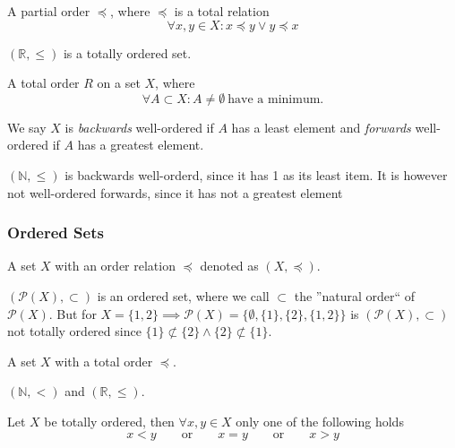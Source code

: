 \begin{definition}
   A partial order \(\preceq\), where \(\preceq\) is a total relation
   \[\forall x, y \in X: x \preceq y \lor y \preceq x\]
\end{definition}
\begin{example}
   \((\mathbb{R}, \leq)\) is a totally ordered set.
\end{example}

\begin{definition}
   A total order \(R\) on a set \(X\), where
   \[\forall A \subset X: A \neq \emptyset~\text{have a minimum.}\]
\end{definition}
\begin{remark}
   We say \(X\) is \emph{backwards} well-ordered if \(A\) has a least element and \emph{forwards} well-ordered if \(A\) has a greatest element.
\end{remark}
\begin{example}
   \((\mathbb{N}, \leq)\) is backwards well-orderd, since it has 1 as its least item.
   It is however not well-ordered forwards, since it has not a greatest element
\end{example}

\subsubsection{Ordered Sets}
\begin{definition}
   A set \(X\) with an order relation \(\preceq\) denoted as \((X, \preceq)\).
\end{definition}
\begin{example}
   \((\mathcal{P}(X), \subset)\) is an ordered set, where we call \(\subset\) the ''natural order`` of \(\mathcal{P}(X)\).
   But for \(X = \{1, 2\} \implies \mathcal{P}(X) = \big\{\emptyset, \{1\}, \{2\}, \{1, 2\}\big\}\) is \((\mathcal{P}(X), \subset)\) not totally ordered since \(\{1\} \not\subset \{2\} \land \{2\} \not\subset \{1\}\).
\end{example}

\begin{definition}
   A set \(X\) with a total order \(\preceq\).
\end{definition}
\begin{example}
   \((\mathbb{N}, <)\) and \((\mathbb{R}, \leq)\).
\end{example}

\begin{proposition}
   Let \(X\) be totally ordered, then \(\forall x, y \in X\) only one of the following holds
   \[x < y \qquad\text{or}\qquad x = y \qquad\text{or}\qquad x > y\]
\end{proposition}

